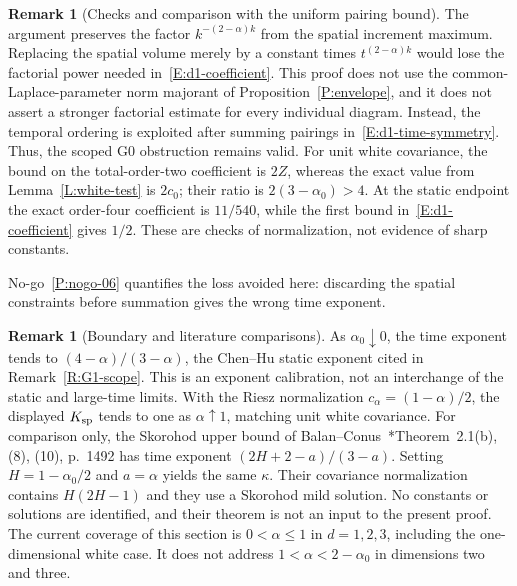 \documentclass[12pt,oneside,openany]{book}
\numberwithin{equation}{section}
\theoremstyle{nogostyle}
\theoremstyle{definition}
\newtheorem{remark}[theorem]{Remark}
\begin{document}
\begin{remark}[Checks and comparison with the uniform pairing bound]\label{R:d1-upper-checks}
  The argument preserves the factor $k^{-(2-\alpha)k}$ from the spatial
  increment maximum. Replacing the spatial volume merely by a constant times
  $t^{(2-\alpha)k}$ would lose the factorial power needed
  in~\eqref{E:d1-coefficient}. This proof does not use the
  common-Laplace-parameter norm majorant of Proposition~\ref{P:envelope}, and it
  does not assert a stronger factorial estimate for every individual diagram.
  Instead, the temporal ordering is exploited after summing pairings
  in~\eqref{E:d1-time-symmetry}. Thus, the scoped G0 obstruction remains valid.
  For unit white covariance, the bound on the total-order-two coefficient is
  $2Z$, whereas the exact value from Lemma~\ref{L:white-test} is $2c_0$; their
  ratio is $2(3-\alpha_0) > 4$. At the static endpoint the exact order-four
  coefficient is $11/540$, while the first bound in~\eqref{E:d1-coefficient}
  gives $1/2$. These are checks of normalization, not evidence of sharp
  constants.
\end{remark}

No-go~\ref{P:nogo-06} quantifies the loss avoided here: discarding the
spatial constraints before summation gives the wrong time exponent.


\begin{remark}[Boundary and literature comparisons]\label{R:d1-comparisons}
  As $\alpha_0\downarrow0$, the time exponent tends to $(4-\alpha)/(3-\alpha)$,
  the Chen--Hu static exponent cited in Remark~\ref{R:G1-scope}. This is an
  exponent calibration, not an interchange of the static and large-time limits.
  With the Riesz normalization $c_\alpha = (1-\alpha)/2$, the displayed $K_{\rm
  sp}$ tends to one as $\alpha\uparrow1$, matching unit white covariance. For
  comparison only, the Skorohod upper bound of
  Balan--Conus~\cite{balan.conus:16:intermittency}*{Theorem~2.1(b), (8), (10),
  p.~1492} has time exponent $(2H+2-a)/(3-a)$. Setting $H = 1-\alpha_0/2$ and $a
  = \alpha$ yields the same $\kappa$. Their covariance normalization contains
  $H(2H-1)$ and they use a Skorohod mild solution. No constants or solutions are
  identified, and their theorem is not an input to the present proof. The
  current coverage of this section is $0 < \alpha \le 1$ in $d = 1,2,3$,
  including the one-dimensional white case. It does not address $1 < \alpha <
  2-\alpha_0$ in dimensions two and three.
\end{remark}
\end{document}
